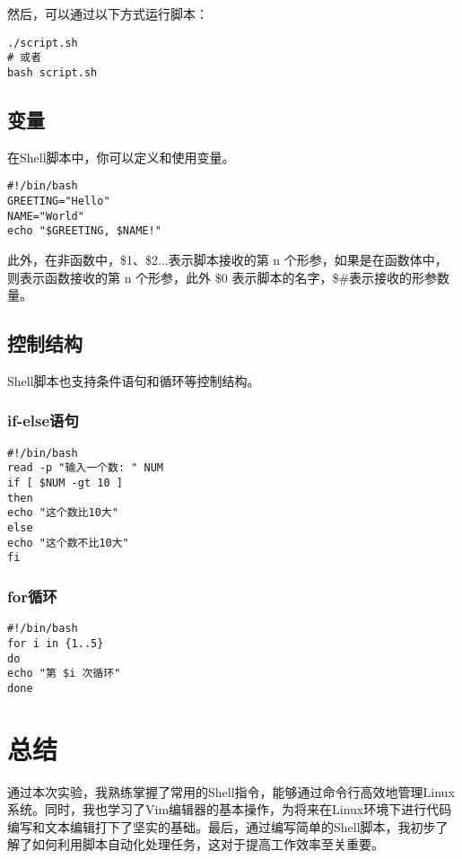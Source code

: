 \documentclass[UTF8]{gyh}
\begin{document}
然后，可以通过以下方式运行脚本：

\begin{lstlisting}
./script.sh
# 或者
bash script.sh
\end{lstlisting}

\subsection{变量}

在Shell脚本中，你可以定义和使用变量。

\begin{lstlisting}
#!/bin/bash
GREETING="Hello"
NAME="World"
echo "$GREETING, $NAME!"
\end{lstlisting}

此外，在非函数中，\$1、\$2...表示脚本接收的第 n 个形参，如果是在函数体中，则表示函数接收的第 n 个形参，此外 \$0 表示脚本的名字，\$#表示接收的形参数量。

\subsection{控制结构}

Shell脚本也支持条件语句和循环等控制结构。

\subsubsection{if-else语句}

\begin{lstlisting}
#!/bin/bash
read -p "输入一个数: " NUM
if [ $NUM -gt 10 ]
then
echo "这个数比10大"
else
echo "这个数不比10大"
fi
\end{lstlisting}

\subsubsection{for循环}

\begin{lstlisting}
#!/bin/bash
for i in {1..5}
do
echo "第 $i 次循环"
done
\end{lstlisting}

\section{总结}

通过本次实验，我熟练掌握了常用的Shell指令，能够通过命令行高效地管理Linux系统。同时，我也学习了Vim编辑器的基本操作，为将来在Linux环境下进行代码编写和文本编辑打下了坚实的基础。最后，通过编写简单的Shell脚本，我初步了解了如何利用脚本自动化处理任务，这对于提高工作效率至关重要。
\end{document}
